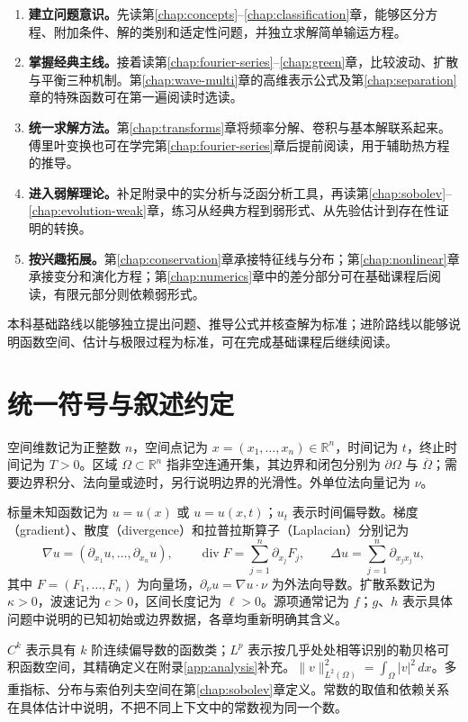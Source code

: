 \documentclass[UTF8,12pt,a4paper,fontset=fandol]{ctexbook}
\begin{document}
\begin{enumerate}
  \item \textbf{建立问题意识。}先读第\ref{chap:concepts}--\ref{chap:classification}章，能够区分方程、附加条件、解的类别和适定性问题，并独立求解简单输运方程。
  \item \textbf{掌握经典主线。}接着读第\ref{chap:fourier-series}--\ref{chap:green}章，比较波动、扩散与平衡三种机制。第\ref{chap:wave-multi}章的高维表示公式及第\ref{chap:separation}章的特殊函数可在第一遍阅读时选读。
  \item \textbf{统一求解方法。}第\ref{chap:transforms}章将频率分解、卷积与基本解联系起来。傅里叶变换也可在学完第\ref{chap:fourier-series}章后提前阅读，用于辅助热方程的推导。
  \item \textbf{进入弱解理论。}补足附录中的实分析与泛函分析工具，再读第\ref{chap:sobolev}--\ref{chap:evolution-weak}章，练习从经典方程到弱形式、从先验估计到存在性证明的转换。
  \item \textbf{按兴趣拓展。}第\ref{chap:conservation}章承接特征线与分布；第\ref{chap:nonlinear}章承接变分和演化方程；第\ref{chap:numerics}章中的差分部分可在基础课程后阅读，有限元部分则依赖弱形式。
\end{enumerate}

本科基础路线以能够独立提出问题、推导公式并核查解为标准；进阶路线以能够说明函数空间、估计与极限过程为标准，可在完成基础课程后继续阅读。

\section{统一符号与叙述约定}

空间维数记为正整数 $n$，空间点记为 $x=(x_1,\ldots,x_n)\in\mathbb R^n$，时间记为 $t$，终止时间记为 $T>0$。区域 $\Omega\subset\mathbb R^n$ 指非空连通开集，其边界和闭包分别为 $\partial\Omega$ 与 $\overline\Omega$；需要边界积分、法向量或迹时，另行说明边界的光滑性。外单位法向量记为 $\nu$。

标量未知函数记为 $u=u(x)$ 或 $u=u(x,t)$；$u_t$ 表示时间偏导数。梯度（gradient）、散度（divergence）和拉普拉斯算子（Laplacian）分别记为
\[
  \nabla u=(\partial_{x_1}u,\ldots,\partial_{x_n}u),\qquad
  \operatorname{div}F=\sum_{j=1}^n\partial_{x_j}F_j,\qquad
  \Delta u=\sum_{j=1}^n\partial_{x_jx_j}u,
\]
其中 $F=(F_1,\ldots,F_n)$ 为向量场，$\partial_\nu u=\nabla u\cdot\nu$ 为外法向导数。扩散系数记为 $\kappa>0$，波速记为 $c>0$，区间长度记为 $\ell>0$。源项通常记为 $f$；$g$、$h$ 表示具体问题中说明的已知初始或边界数据，各章均重新明确其含义。

$C^k$ 表示具有 $k$ 阶连续偏导数的函数类；$L^p$ 表示按几乎处处相等识别的勒贝格可积函数空间，其精确定义在附录\ref{app:analysis}补充。$\|v\|_{L^2(\Omega)}^2=\int_\Omega |v|^2\,dx$。多重指标、分布与索伯列夫空间在第\ref{chap:sobolev}章定义。常数的取值和依赖关系在具体估计中说明，不把不同上下文中的常数视为同一个数。
\end{document}
